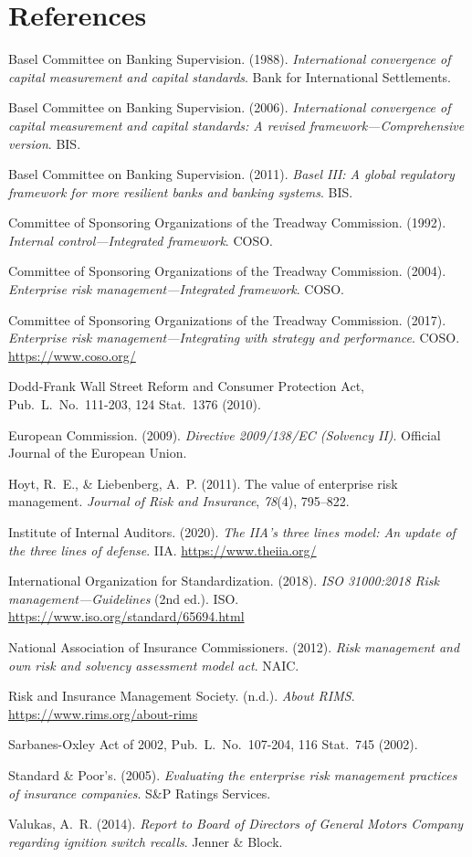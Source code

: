 \documentclass[11pt,openany]{book}
\begin{document}
\section*{References}
\begingroup
\sloppy

Basel Committee on Banking Supervision. (1988). \emph{International convergence of capital measurement and capital standards}. Bank for International Settlements.

Basel Committee on Banking Supervision. (2006). \emph{International convergence of capital measurement and capital standards: A revised framework---Comprehensive version}. BIS.

Basel Committee on Banking Supervision. (2011). \emph{Basel III: A global regulatory framework for more resilient banks and banking systems}. BIS.

Committee of Sponsoring Organizations of the Treadway Commission. (1992). \emph{Internal control---Integrated framework}. COSO.

Committee of Sponsoring Organizations of the Treadway Commission. (2004). \emph{Enterprise risk management---Integrated framework}. COSO.

Committee of Sponsoring Organizations of the Treadway Commission. (2017). \emph{Enterprise risk management---Integrating with strategy and performance}. COSO. \url{https://www.coso.org/}

Dodd-Frank Wall Street Reform and Consumer Protection Act, Pub.\ L.\ No.\ 111-203, 124 Stat.\ 1376 (2010).

European Commission. (2009). \emph{Directive 2009/138/EC (Solvency II)}. Official Journal of the European Union.

Hoyt, R.~E., \& Liebenberg, A.~P. (2011). The value of enterprise risk management. \emph{Journal of Risk and Insurance}, \emph{78}(4), 795--822.

Institute of Internal Auditors. (2020). \emph{The IIA's three lines model: An update of the three lines of defense}. IIA. \url{https://www.theiia.org/}

International Organization for Standardization. (2018). \emph{ISO 31000:2018 Risk management---Guidelines} (2nd ed.). ISO. \url{https://www.iso.org/standard/65694.html}

National Association of Insurance Commissioners. (2012). \emph{Risk management and own risk and solvency assessment model act}. NAIC.

Risk and Insurance Management Society. (n.d.). \emph{About RIMS}. \url{https://www.rims.org/about-rims}

Sarbanes-Oxley Act of 2002, Pub.\ L.\ No.\ 107-204, 116 Stat.\ 745 (2002).

Standard \& Poor's. (2005). \emph{Evaluating the enterprise risk management practices of insurance companies}. S\&P Ratings Services.

Valukas, A.~R. (2014). \emph{Report to Board of Directors of General Motors Company regarding ignition switch recalls}. Jenner \& Block.

\endgroup
\end{document}
